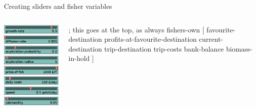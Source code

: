 \documentclass[table, 14pt, aspectratio=169]{beamer}
\begin{document}
\begin{frame}
\begin{columns}
\begin{column}{0.65\textwidth}
    \end{column}    
  \end{columns}
\end{frame}

\begin{frame}[fragile=singleslide]{Creating sliders and fisher variables}
  \begin{columns}[T]
    \begin{column}{0.3\textwidth}
      \includegraphics[width=\linewidth]{images/sliders.png}      
    \end{column}
    \begin{column}{0.7\textwidth}\small
      \begin{nlogo}
  ; this goes at the top, as always
  fishers-own [
    favourite-destination
    profits-at-favourite-destination
    current-destination
    trip-destination
    trip-costs
    bank-balance
    biomass-in-hold
  ]
      \end{nlogo}
    \end{column}
  \end{columns}
\end{frame}
\end{document}
